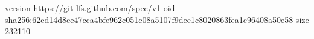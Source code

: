 version https://git-lfs.github.com/spec/v1
oid sha256:62ed14d8ce47cca4bfe962c051c08a5107f9dee1c8020863fea1c96408a50e58
size 232110
